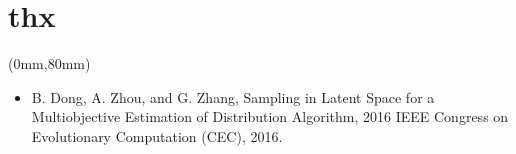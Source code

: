 \documentclass[xcolor=dvipsnames]{beamer}
\newenvironment{reference}[2]{%
  \begin{textblock*}{\textwidth}(#1,#2)
     \bgroup\fontsize{6pt}{\baselineskip}\selectfont\color[RGB]{0,112,192}}{\egroup\end{textblock*}}
\begin{document}
    \section*{thx}
        \begin{frame}
        \begin{center}
        \fontsize{60pt}{\baselineskip}\selectfont {}
        \end{center}
        \begin{reference}{0mm}{80mm}
        \begin{itemize}
        \item  B. Dong, A. Zhou, and G. Zhang, Sampling in Latent Space for a Multiobjective Estimation of Distribution Algorithm, 2016 IEEE Congress on Evolutionary Computation (CEC), 2016.       
        \end{itemize}
        \end{reference}
        \end{frame}
\end{document}
